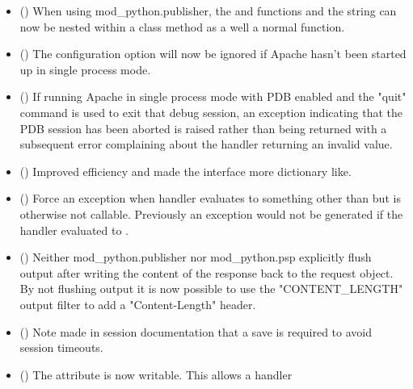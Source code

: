   \begin{itemize}
    \item
      ()
      When using mod_python.publisher, the  and
       functions and the  string
      can now be nested within a class method as a well a normal function.
    \item
      ()
      The  configuration option will now be ignored
      if Apache hasn't been started up in single process mode.
    \item
      ()
      If running Apache in single process mode with PDB enabled and the
      "quit" command is used to exit that debug session, an exception
      indicating that the PDB session has been aborted is raised rather
      than  being returned with a subsequent error complaining
      about the handler returning an invalid value.
    \item
      ()
      Improved  efficiency and made the interface
      more dictionary like.
    \item
      ()
      Force an exception when handler evaluates to something other than
       but is otherwise not callable. Previously an exception
      would not be generated if the handler evaluated to .
    \item
      ()
      Neither mod_python.publisher nor mod_python.psp explicitly flush
      output after writing the content of the response back to the request
      object. By not flushing output it is now possible to use the
      "CONTENT_LENGTH" output filter to add a "Content-Length" header.
    \item
      ()
      Note made in session documentation that a save is required to avoid
      session timeouts.
    \item
      ()
      The  attribute is now writable. This allows a handler

\end{itemize}
